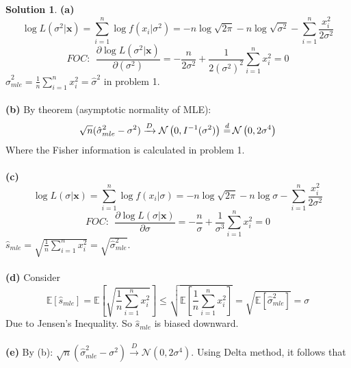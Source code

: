 \documentclass[a4paper, 10pt]{article}
\theoremstyle{definition}
\theoremstyle{hSol}
\newtheorem*{solution}{Solution}
\begin{document}
\begin{solution} \textbf{(a)}
\begin{equation}
  \log L(\sigma^2|\bm{x}) = \sum_{i=1}^n\log f(x_i|\sigma^2) = -n\log \sqrt{2\pi} - n\log \sqrt{\sigma^2} - \sum_{i=1}^n\frac{x_i^2}{2\sigma^2}
\end{equation}
\begin{equation}
  FOC:~~\frac{\partial \log L(\sigma^2|\bm{x})}{\partial (\sigma^2)} = -\frac{n}{2\sigma^2} + \frac{1}{2(\sigma^2)^2}\sum_{i=1}^n x_i^2 = 0
\end{equation}
$\hat{\sigma}^2_{mle} = \frac{1}{n}\sum_{i=1}^n x_i^2 = \hat{\sigma}^2$ in problem 1.\\
~\\
\textbf{(b)} By theorem (asymptotic normality of MLE): 
\begin{equation}
  \sqrt{n}(\hat{\sigma}_{mle}^2-\sigma^2) \xrightarrow{D} \mathcal{N}\left(0, I^{-1}(\sigma^2) \right) \,{\buildrel d \over =}\, \mathcal{N}\left(0, 2\sigma^4 \right)
\end{equation}
Where the Fisher information is calculated in problem 1. \\
~\\
\textbf{(c)} 
\begin{equation}
  \log L(\sigma|\bm{x}) = \sum_{i=1}^n\log f(x_i|\sigma) = -n\log \sqrt{2\pi} - n\log \sigma - \sum_{i=1}^n\frac{x_i^2}{2\sigma^2}
\end{equation}
\begin{equation}
  FOC:~~\frac{\partial \log L(\sigma|\bm{x})}{\partial \sigma} = -\frac{n}{\sigma} + \frac{1}{\sigma^3}\sum_{i=1}^n x_i^2 = 0
\end{equation}
$\hat{s}_{mle} = \sqrt{\frac{1}{n}\sum_{i=1}^n x_i^2} = \sqrt{\hat{\sigma}^2_{mle}}$. \\
~\\
\textbf{(d)} Consider
\begin{equation}
  \mathbb{E}\left[\hat{s}_{mle}\right] = \mathbb{E}\left[\sqrt{\frac{1}{n}\sum_{i=1}^n x_i^2}\right] \leq \sqrt{\mathbb{E}\left[\frac{1}{n}\sum_{i=1}^n x_i^2\right]} = \sqrt{\mathbb{E}\left[\hat{\sigma}_{mle}^2\right]} = \sigma
\end{equation}
Due to Jensen's Inequality. So $\hat{s}_{mle}$ is biased downward.\\
~\\
\textbf{(e)} By (b): $\sqrt{n}(\hat{\sigma}^2_{mle}-\sigma^2) \xrightarrow{D} \mathcal{N}(0, 2\sigma^4)$. Using Delta method, it follows that
\begin{equation}

\end{equation}
\end{solution}
\end{document}
